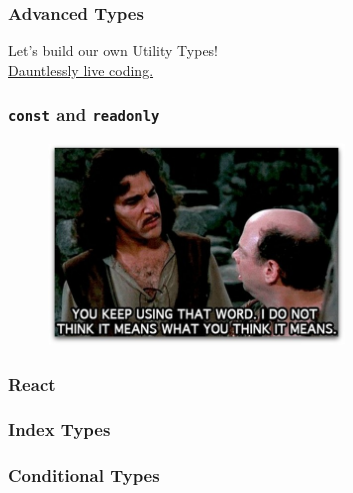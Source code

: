\documentclass[aspectratio=169]{beamer}
\begin{document}
\begin{frame}[fragile]
  \frametitle{Advanced Types}

  Let's build our own Utility Types! \\

  \href{https://www.typescriptlang.org/play?noUncheckedIndexedAccess=true&noUnusedLocals=true&noUnusedParameters=true&strict=true&allowSyntheticDefaultImports=false&noPropertyAccessFromIndexSignature=true&noFallthroughCasesInSwitch=true#code/JYOwLgpgTgZghgYwgAgMoQLbALIE8DOkUuACtPgPYjIDeAUMsjMFIQHJwYQD8AXMoSigA5gG4GyADZx2nCP0EjxAXzp0wuAA4o8AJQgBHAK4sIAEwA8AFQB8yALzIA9E+QBJDJsmYI4ZF3UtHVI4KDBgOElrO0cXd09vLj8AwO1kPEJoUnIqB3SQsIio9CwMomzWKhtxDTSAMQowgAshYSawMkrqRz1DEyhzCxKcAnLOyhBqoA}{Dauntlessly live coding.}
\end{frame}

\begin{frame}[fragile]
  \frametitle{\texttt{const} and \texttt{readonly}}
  \begin{figure}
    \href{https://www.typescriptlang.org/play?noUncheckedIndexedAccess=true&noUnusedLocals=true&noUnusedParameters=true&ssl=8&ssc=3&pln=7&pc=4#code/MYewdgzgLgBADgJwJZigQQQghgTwOpJQAWAciCQK4A2VEMAvDABRaYBcMG2OAPGBQFsARgFMEMAD4x+NAHwBKDgDcQSACYNZMAN4AoGDABmIcUyojYSBjAAMAbhhWeMVggB05sAHNiDgNR+SPI6+gaOhswsmADaSAC61jJU8sF6YWGgqCgUInahBgC++TCZECDmHiBeUQixcfJ5hboFebqlsAI4XLgc3bz8wmKS0tRUWozRAMwANCM0swCsswDss0mzAIw2ca2IKOiYuATEZJQ0EEydfQ26beBlFVRVl12HODdAA}{\includegraphics[width=0.7\textwidth]{using_that_word.jpg}}
  \end{figure}
\end{frame}

\begin{frame}
  \frametitle{React}
\end{frame}

\begin{frame}
  \frametitle{Index Types}
\end{frame}

\begin{frame}
  \frametitle{Conditional Types}
\end{frame}
\end{document}
